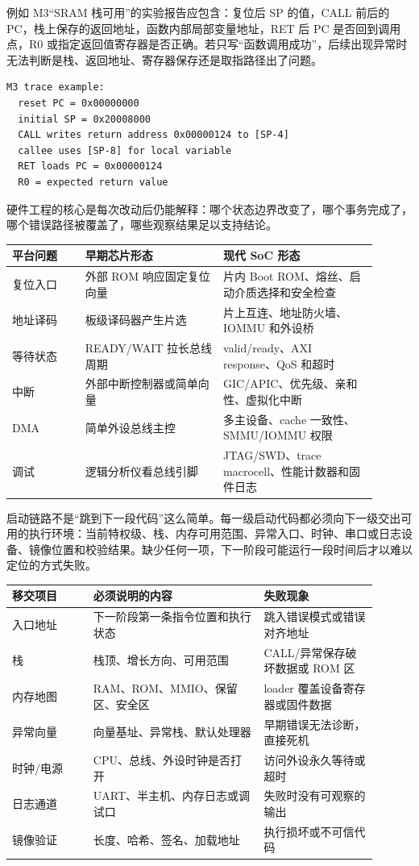 例如 M3“SRAM 栈可用”的实验报告应包含：复位后 SP 的值，CALL 前后的 PC，栈上保存的返回地址，函数内部局部变量地址，RET 后 PC 是否回到调用点，R0 或指定返回值寄存器是否正确。若只写“函数调用成功”，后续出现异常时无法判断是栈、返回地址、寄存器保存还是取指路径出了问题。

\begin{lstlisting}
M3 trace example:
  reset PC = 0x00000000
  initial SP = 0x20008000
  CALL writes return address 0x00000124 to [SP-4]
  callee uses [SP-8] for local variable
  RET loads PC = 0x00000124
  R0 = expected return value
\end{lstlisting}

硬件工程的核心是每次改动后仍能解释：哪个状态边界改变了，哪个事务完成了，哪个错误路径被覆盖了，哪些观察结果足以支持结论。


\begin{longtable}{L{0.18\linewidth}L{0.34\linewidth}L{0.38\linewidth}}
\toprule
平台问题 & 早期芯片形态 & 现代 SoC 形态 \\
\midrule
复位入口 & 外部 ROM 响应固定复位向量 & 片内 Boot ROM、熔丝、启动介质选择和安全检查 \\
地址译码 & 板级译码器产生片选 & 片上互连、地址防火墙、IOMMU 和外设桥 \\
等待状态 & READY/WAIT 拉长总线周期 & valid/ready、AXI response、QoS 和超时 \\
中断 & 外部中断控制器或简单向量 & GIC/APIC、优先级、亲和性、虚拟化中断 \\
DMA & 简单外设总线主控 & 多主设备、cache 一致性、SMMU/IOMMU 权限 \\
调试 & 逻辑分析仪看总线引脚 & JTAG/SWD、trace macrocell、性能计数器和固件日志 \\
\bottomrule
\end{longtable}

启动链路不是“跳到下一段代码”这么简单。每一级启动代码都必须向下一级交出可用的执行环境：当前特权级、栈、内存可用范围、异常入口、时钟、串口或日志设备、镜像位置和校验结果。缺少任何一项，下一阶段可能运行一段时间后才以难以定位的方式失败。

\begin{longtable}{L{0.2\linewidth}L{0.42\linewidth}L{0.28\linewidth}}
\toprule
移交项目 & 必须说明的内容 & 失败现象 \\
\midrule
入口地址 & 下一阶段第一条指令位置和执行状态 & 跳入错误模式或错误对齐地址 \\
栈 & 栈顶、增长方向、可用范围 & CALL/异常保存破坏数据或 ROM 区 \\
内存地图 & RAM、ROM、MMIO、保留区、安全区 & loader 覆盖设备寄存器或固件数据 \\
异常向量 & 向量基址、异常栈、默认处理器 & 早期错误无法诊断，直接死机 \\
时钟/电源 & CPU、总线、外设时钟是否打开 & 访问外设永久等待或超时 \\
日志通道 & UART、半主机、内存日志或调试口 & 失败时没有可观察的输出 \\
镜像验证 & 长度、哈希、签名、加载地址 & 执行损坏或不可信代码 \\
\bottomrule
\end{longtable}

